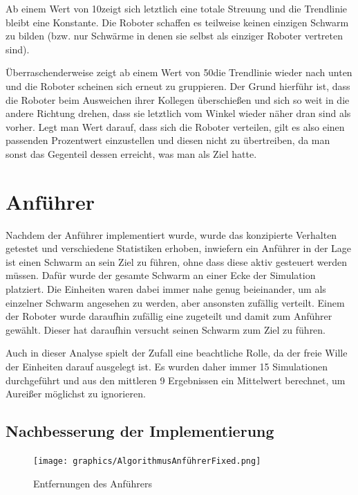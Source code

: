 Ab einem Wert von 10\per zeigt sich letztlich eine totale Streuung und die Trendlinie bleibt eine Konstante. Die Roboter schaffen es teilweise keinen einzigen Schwarm zu bilden (bzw. nur Schwärme in denen sie selbst als einziger Roboter vertreten sind).

Überraschenderweise zeigt ab einem Wert von 50\per die Trendlinie wieder nach unten und die Roboter scheinen sich erneut zu gruppieren. Der Grund hierführ ist, dass die Roboter beim Ausweichen ihrer Kollegen überschießen und sich so weit in die andere Richtung drehen, dass sie letztlich vom Winkel wieder näher dran sind als vorher. Legt man Wert darauf, dass sich die Roboter verteilen, gilt es also einen passenden Prozentwert einzustellen und diesen nicht zu übertreiben, da man sonst das Gegenteil dessen erreicht, was man als Ziel hatte.







\section{Anführer}

Nachdem der Anführer implementiert wurde, wurde das konzipierte Verhalten getestet und verschiedene Statistiken erhoben, inwiefern ein Anführer in der Lage ist einen Schwarm an sein Ziel zu führen, ohne dass diese aktiv gesteuert werden müssen.
Dafür wurde der gesamte Schwarm an einer Ecke der Simulation platziert. Die Einheiten waren dabei immer nahe genug beieinander, um als einzelner Schwarm angesehen zu werden, aber ansonsten zufällig verteilt. Einem der Roboter wurde daraufhin zufällig eine  zugeteilt und damit zum Anführer gewählt. Dieser hat daraufhin versucht seinen Schwarm zum Ziel zu führen.

Auch in dieser Analyse spielt der Zufall eine beachtliche Rolle, da der freie Wille der Einheiten darauf ausgelegt ist. Es wurden daher immer 15 Simulationen durchgeführt und aus den mittleren 9 Ergebnissen ein Mittelwert berechnet, um Aureißer möglichst zu ignorieren.

\subsection*{Nachbesserung der Implementierung}\label{subsec:AnalyseNachbesserung}

\begin{figure}
	\texttt{[image: graphics/AlgorithmusAnführerFixed.png]}
	\caption{Entfernungen des Anführers}
	\label{pic:AnführerReichweitenFixed}
\end{figure}

